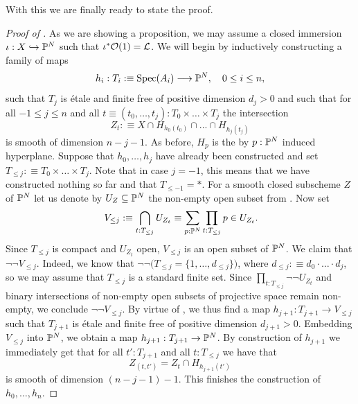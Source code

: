 With this we are finally ready to state the proof.

\begin{proof}[Proof of ]
  As we are showing a proposition, we may assume a closed immersion $\iota : X \hookrightarrow \mathbb{P}^N$ such that $\iota^\ast\mathcal{O}(1) = \mathcal{L}$.
  We will begin by inductively constructing a family of maps
  \[
    h_i : T_i :\equiv \operatorname{Spec}(A_i) \longrightarrow \mathbb{P}^N, \quad 0 \leq i \leq n,
  \]
  such that $T_j$ is étale and finite free of positive dimension $d_j > 0$ and such that for all $-1 \leq j \leq n$ and all $t \equiv (t_0, \hdots, t_j) : T_0 \times \hdots \times T_j$ the intersection
  \[
    Z_t :\equiv X \cap H_{h_0(t_0)} \cap ... \cap H_{h_j(t_j)}
  \]
  is smooth of dimension $n-j-1$.
  As before, $H_p$ is the by $p:\mathbb{P}^N$ induced hyperplane.
  Suppose that $h_0, \hdots, h_j$ have already been constructed and set $T_{\leq j} :\equiv T_0 \times \hdots \times T_j$.
  Note that in case $j=-1$, this means that we have constructed nothing so far and that $T_{\leq -1} = \ast$.
  For a smooth closed subscheme $Z$ of $\mathbb{P}^N$ let us denote by $U_Z \subseteq \mathbb{P}^N$ the non-empty open subset from .
  Now set
  \[
    V_{\leq j} :\equiv \bigcap_{t:T_{\leq j}}U_{Z_t}
                \equiv \sum_{p : \bP^N} \prod_{t:T_{\leq j}} p \in U_{Z_t} \rlap{.}
  \]
  Since $T_{\leq j}$ is compact and $U_{Z_t}$ open, $V_{\leq j}$ is an open subset of $\mathbb{P}^N$.
  We claim that $\neg\neg V_{\leq j}$.
  Indeed, we know that $\neg\neg \big( T_{\leq j} = \{1, \hdots, d_{\leq j}\} \big)$, where $d_{\leq j} :\equiv d_0 \cdot \hdots \cdot d_j$, so we may assume that $T_{\leq j}$ is a standard finite set.
  Since $\prod_{t:T_{\leq j}}\neg\neg U_{Z_t}$ and binary intersections of non-empty open subsets of projective space remain non-empty, we conclude $\neg\neg V_{\leq j}$.
  By virtue of , we thus find a map $h_{j+1} : T_{j+1} \to V_{\leq j}$ such that $T_{j+1}$ is étale and finite free of positive dimension $d_{j+1} > 0$.
  Embedding $V_{\leq j}$ into $\mathbb{P}^N$, we obtain a map $h_{j+1} : T_{j+1} \to \mathbb{P}^N$.
  By construction of $h_{j+1}$ we immediately get that for all $t':T_{j+1}$ and all $t:T_{\leq j}$ we have that
  \[
    Z_{(t,t')} = Z_t \cap H_{h_{j+1}(t')}
  \]
  is smooth of dimension $(n-j-1)-1$.
  This finishes the construction of $h_0, \hdots, h_n$.


\end{proof}
